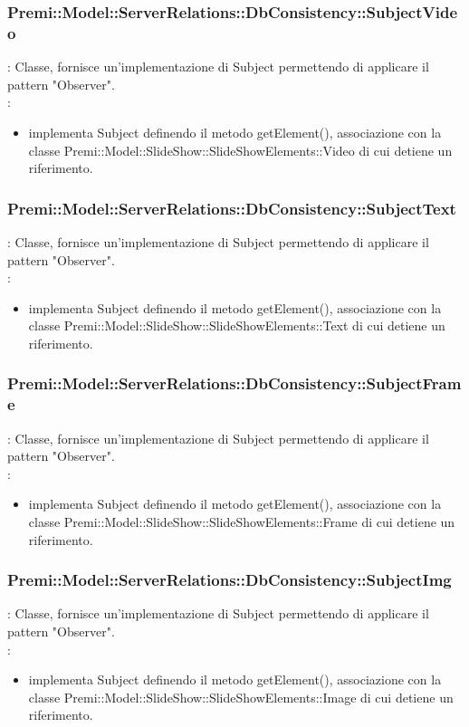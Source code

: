 {            \subsubsection{Premi::Model::ServerRelations::DbConsistency::SubjectVideo}{
				\textbf{\tipo}: Classe, fornisce un’implementazione di Subject permettendo di applicare il pattern "Observer".\\	
				\textbf{\relaz}: 
				\begin{itemize}
					\item implementa Subject definendo il metodo getElement(), associazione con la classe Premi::Model::SlideShow::SlideShowElements::Video di cui detiene un riferimento.
				\end{itemize}	
            }
            
            \subsubsection{Premi::Model::ServerRelations::DbConsistency::SubjectText}{
				\textbf{\tipo}: Classe, fornisce un’implementazione di Subject permettendo di applicare il pattern "Observer".\\	
				\textbf{\relaz}: 
				\begin{itemize}
					\item implementa Subject definendo il metodo getElement(), associazione con la classe Premi::Model::SlideShow::SlideShowElements::Text di cui detiene un riferimento.
				\end{itemize}	
            }
            
            \subsubsection{Premi::Model::ServerRelations::DbConsistency::SubjectFrame}{
				\textbf{\tipo}: Classe, fornisce un’implementazione di Subject permettendo di applicare il pattern "Observer".\\	
				\textbf{\relaz}: 
				\begin{itemize}
					\item implementa Subject definendo il metodo getElement(), associazione con la classe Premi::Model::SlideShow::SlideShowElements::Frame di cui detiene un riferimento.
				\end{itemize}	
            }
            
            \subsubsection{Premi::Model::ServerRelations::DbConsistency::SubjectImg}{
				\textbf{\tipo}: Classe, fornisce un’implementazione di Subject permettendo di applicare il pattern "Observer".\\	
				\textbf{\relaz}: 
				\begin{itemize}
					\item implementa Subject definendo il metodo getElement(), associazione con la classe Premi::Model::SlideShow::SlideShowElements::Image di cui detiene un riferimento.
				\end{itemize}	
            }
            
}

